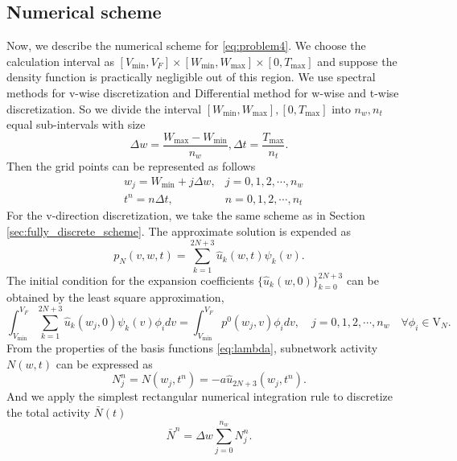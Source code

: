 \subsection{Numerical scheme}
Now, we describe the numerical scheme for \eqref{eq:problem4}. We choose the calculation interval as $[V_{\text{min}},V_F]\times [W_{\text{min}},W_{\text{max}}]\times [0,T_{\text{max}}]$ and suppose the density function is practically negligible out of this region.
We use spectral methods for v-wise discretization and Differential method for w-wise and t-wise discretization. So we divide the interval $[W_{\text{min}},W_{\text{max}}],[0,T_{\text{max}}]$ into $n_w,n_t$ equal sub-intervals with size
\begin{equation}
    \Delta w=\frac{W_{\text{max}}-W_{\text{min}}}{n_w},\Delta t=\frac{T_{\text{max}}}{n_t}.
\end{equation}
Then the grid points can be represented as follows
\begin{equation}
    \begin{aligned}
        &w_{j}=W_{\text{min} }+j \Delta w, & j=0,1,2, \cdots, n_{w} \\
        &t^{n}=n \Delta t, & n=0,1,2, \cdots, n_{t}
    \end{aligned}
\end{equation}
For the v-direction discretization, we take the same scheme as in Section \ref{sec:fully_discrete_scheme}. The approximate solution is expended as 
\begin{equation}
    \label{eq:approximate_solution4}
    p_N(v,w,t)=\sum_{k=1}^{2N+3}\hat{u}_k(w,t)\psi_k(v).
\end{equation}
The initial condition for the expansion coefficients $\{\hat{u}_{k}(w,0)\}_{k=0}^{2N+3}$ can be obtained by the least square approximation,
\begin{equation}
    \label{eq:initial_vector3}
    \int_{V_{\min}}^{V_F} \sum_{k=1}^{2N+3}\hat{u}_k(w_j,0)\psi_k(v) \phi_i dv=\int_{V_{\min}}^{V_F} p^0(w_j,v)\phi_i dv, \quad j=0,1,2, \cdots, n_{w} \quad \forall \phi_i \in \mathrm{V}_N.
\end{equation}
From the properties of the basis functions \eqref{eq:lambda}, subnetwork activity $N(w,t)$ can be expressed as
\begin{equation}
    N^n_j=N(w_j,t^n)=-a\hat{u}_{2N+3}(w_j,t^n).
\end{equation}
And we apply the simplest rectangular numerical integration rule to discretize the total activity $\bar{N}(t)$
\begin{equation}
    \bar{N}^n=\Delta w \sum_{j=0}^{n_w}N^n_j.
\end{equation}
